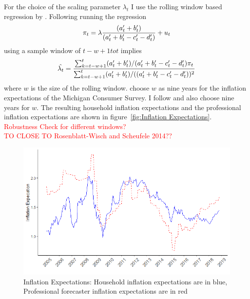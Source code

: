 \documentclass[review]{elsarticle}
\begin{document}
For the choice of the scaling parameter $\lambda_t$ I use the rolling window based regression by \cite{Lahiri2015}. Following \cite{Rosenblatt-Wisch2015} running the regression
\begin{align*}
\pi_t = \lambda \frac{(a_t\sp{\prime} + b_t\sp{\prime})}{(a_t\sp{\prime} + b_t\sp{\prime} - c_t\sp{\prime} - d_t\sp{\prime})} + u_t 
\end{align*}
using a sample window of $t - w + 1 to t$ implies
\begin{align*}
\hat{\lambda_t} = \frac{\sum^t_{k = t-w+1}(a_t\sp{\prime} + b_t\sp{\prime})/(a_t\sp{\prime} + b_t\sp{\prime} - c_t\sp{\prime} - d_t\sp{\prime})\pi_t}{\sum^t_{k = t-w+1}(a_t\sp{\prime} + b_t\sp{\prime})/((a_t\sp{\prime} + b_t\sp{\prime} - c_t\sp{\prime} - d_t\sp{\prime}))^2}
\end{align*}
where $w$ is the size of the rolling window. \cite{Lahiri2015} choose $w$ as nine years for the inflation expectations of the Michigan Consumer Survey. I follow \cite{Lahiri2015} and also choose nine years for $w$. The resulting household inflation expectations and the professional inflation expectations are shown in figure~\ref{fig:Inflation Expectations}.
\\
\textcolor{red}{Robustness Check for different windows?}
\\
\textcolor{red}{TO CLOSE TO Rosenblatt-Wisch and Scheufele 2014??}

  \begin{figure}[!ht]
    \centering
    \includegraphics{household_prof_inf.png}
    \caption{Inflation Expectations: Household inflation expectations are in blue, Professional forecaster inflation expectations are in red}
    \end{figure}
\label{fig:Inflation Expectations}
\end{document}
